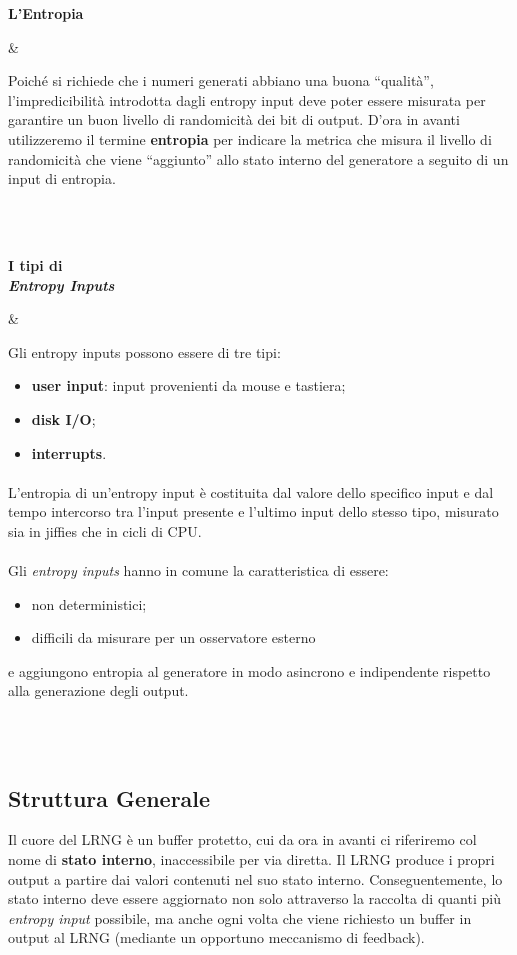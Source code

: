 \documentclass{article}
\newcommand{\knizPar}[3]{%
  \parbox[t]{0.15\textwidth}{\footnotesize
  \textbf{#1\\#2}}&\parbox[t]{0.85\textwidth}{%
    \hspace{1.5em}#3
    \vspace{\parsep}%
  }\\\\}
\begin{document}
 \knizPar{L'Entropia}{}{Poiché si richiede che i numeri generati abbiano una
 buona ``qualità'', l'impredicibilità introdotta dagli entropy input deve poter essere
 misurata per garantire un buon livello di randomicità dei bit di output. D'ora
 in avanti utilizzeremo il termine \textbf{entropia} per indicare la
 metrica che misura il livello di randomicità che viene ``aggiunto'' allo stato interno
 del generatore a seguito di un input di entropia. }
 \knizPar{I tipi di}{\emph{Entropy Inputs}}{ Gli entropy inputs possono essere
 di tre tipi:
 \begin{itemize}
   \item \textbf{user input}: input provenienti da mouse e tastiera;
   \item \textbf{disk I/O};
   \item \textbf{interrupts}.
 \end{itemize}
 \paragraph{}L'entropia di un'entropy input è costituita dal valore dello
 specifico input e dal tempo intercorso tra l'input presente e l'ultimo input
 dello stesso tipo, misurato sia in jiffies che in cicli di CPU. 
 
 \paragraph{}Gli \emph{entropy inputs} hanno in comune la
 caratteristica di essere:
 \begin{itemize}
   \item non deterministici;
   \item difficili da misurare per un osservatore esterno
 \end{itemize}
e aggiungono entropia al generatore in modo asincrono e
 indipendente rispetto alla generazione degli output. 
 }
 
 \subsection{Struttura Generale}
 Il cuore del LRNG è un buffer protetto, cui da ora in avanti ci riferiremo col
 nome di \textbf{stato interno}, inaccessibile per via diretta. Il LRNG produce
 i propri output a partire dai valori contenuti nel suo stato interno.
 Conseguentemente, lo stato interno deve essere aggiornato non solo attraverso
 la raccolta di quanti più \emph{entropy input} possibile, ma anche ogni volta
 che viene richiesto un buffer in output al LRNG (mediante un
 opportuno meccanismo di feedback).
 
\end{document}
